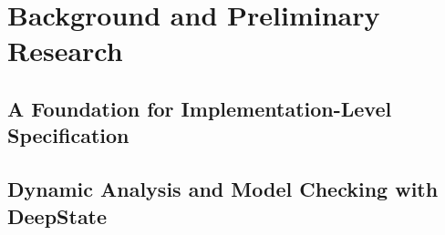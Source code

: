 \section{Background and Preliminary Research}

\subsection{A Foundation for Implementation-Level Specification}


\subsection{Dynamic Analysis and Model Checking with DeepState}


